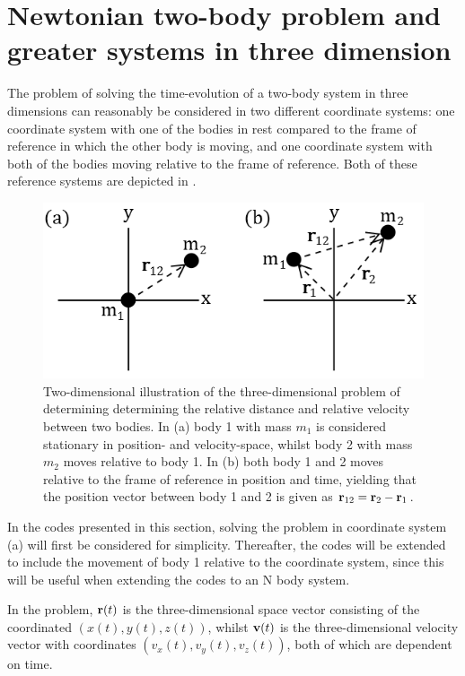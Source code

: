 \section{Newtonian two-body problem and greater systems in three dimension}
\label{Newton2body3D}
The problem of solving the time-evolution of a two-body system in three dimensions can reasonably be considered in two different coordinate systems: one coordinate system with one of the bodies in rest compared to the frame of reference in which the other body is moving, and one coordinate system with both of the bodies moving relative to the frame of reference. 
Both of these reference systems are depicted in . 
\begin{figure}[H]
\centering
	\includegraphics[width=0.6\linewidth]{Figures/2bodyproblem_coordinatesystems.png}
\caption{
Two-dimensional illustration of the three-dimensional problem of determining determining the relative distance and relative velocity between two bodies. 
In (a) body 1 with mass $m_1$ is considered stationary in position- and velocity-space, whilst body 2 with mass $m_2$ moves relative to body 1.
In (b) both body 1 and 2 moves relative to the frame of reference in position and time, yielding that the position vector between body 1 and 2 is given as $\mbox{\textbf{r}}_{12} = \mbox{\textbf{r}}_2 - \mbox{\textbf{r}}_1$.
}
\label{fig:2bodyproblem_coordinatesystems}
\end{figure}
In the codes presented in this section, solving the problem in coordinate system (a) will first be considered for simplicity. Thereafter, the codes will be extended to include the movement of body 1 relative to the coordinate system, since this will be useful when extending the codes to an N body system.  

In the problem, $\mbox{\textbf{r}}(t)$ is the three-dimensional space vector consisting of the coordinated $(x(t),y(t),z(t))$, whilst $\mbox{\textbf{v}}(t)$ is the three-dimensional velocity vector with coordinates $(v_x(t),v_y(t),v_z(t))$, both of which are dependent on time. 

